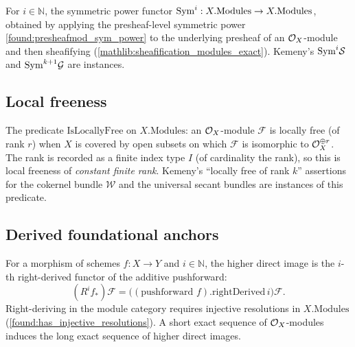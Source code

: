 \begin{definition}\leanok
  \label{found:oxmod_sym_power}
  For \(i\in\mathbb N\), the symmetric power functor
  \(\mathrm{Sym}^i:X.\mathrm{Modules}\to X.\mathrm{Modules}\), obtained by applying the
  presheaf-level symmetric power \cref{found:presheafmod_sym_power} to the
  underlying presheaf of an \(\mathcal{O}_X\)-module and then sheafifying
  (\cref{mathlib:sheafification_modules_exact}).  Kemeny's \(\mathrm{Sym}^i\mathcal{S}\) and
  \(\mathrm{Sym}^{k+1}\mathcal{G}\) are instances.
\end{definition}

\subsection{Local freeness}

\begin{definition}
  \leanok
  \label{found:locally_free}
  The predicate \(\mathrm{IsLocallyFree}\) on \(X.\mathrm{Modules}\): an
  \(\mathcal{O}_X\)-module \(\mathcal F\) is locally free (of rank \(r\)) when \(X\) is
  covered by open subsets on which \(\mathcal F\) is isomorphic to
  \(\mathcal{O}_X^{\oplus r}\).  The rank is recorded as a finite index type \(I\) (of
  cardinality the rank), so this is local freeness of \emph{constant finite
  rank}.  Kemeny's ``locally free of rank \(k\)'' assertions for the cokernel
  bundle \(\mathcal W\) and the universal secant bundles are instances of this
  predicate.
\end{definition}

\subsection{Derived foundational anchors}

\begin{definition}
  \leanok
  \label{def:peer_higher_direct_image}
  For a morphism of schemes \(f:X\to Y\) and \(i\in\mathbb N\), the higher direct
  image is the \(i\)-th right-derived functor of the additive pushforward:
  \[
    (R^if_*)\mathcal F=\bigl((\text{pushforward }f).\mathrm{rightDerived}\,i\bigr)\mathcal F .
  \]
  Right-deriving in the module category requires injective resolutions in
  \(X.\mathrm{Modules}\) (\cref{found:has_injective_resolutions}).  A short exact
  sequence of \(\mathcal{O}_X\)-modules induces the long exact sequence of higher direct
  images.
\end{definition}

